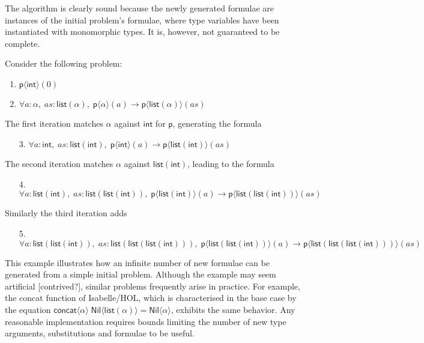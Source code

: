 \documentclass[]{ceurart}
\newcommand\ty[1]{\textsf{#1}}
\newcommand\sym[1]{\textsf{#1}}
\begin{document}
The algorithm is clearly sound because the newly generated formulae are instances of the initial problem's formulae, where type variables have been instantiated with monomorphic types. It is, however, not guaranteed to be complete.

\begin{example}Consider the following problem:
\begin{enumerate}
   \item \(\sym{p}\langle \ty{int}\rangle(0)\)
   \item \(\forall a: \alpha{,}\; \mathit{as}:\ty{list}(\alpha){,}\; \sym{p}\langle\alpha\rangle(a) \rightarrow \sym{p}\langle \ty{list}(\alpha)\rangle(\mathit{as})\)
\end{enumerate}
%
The first iteration matches \(\alpha\) against \(\ty{int}\) for $\sym{p}$, generating the formula
%
\begin{enumerate}
   \item[3.] \(\forall a: \ty{int}{,}\; \mathit{as}:\ty{list}(\ty{int}){,}\; \sym{p}\langle\ty{int}\rangle(a) \rightarrow \sym{p}\langle \ty{list}(\ty{int})\rangle(\mathit{as})\)
\end{enumerate}
%
The second iteration matches \(\alpha\) against \(\ty{list}(\ty{int})\), leading to the formula
%
\begin{enumerate}
   \item[4.] \(\forall a: \ty{list}(\ty{int}){,}\; \mathit{as}:\ty{list}(\ty{list}(\ty{int})){,}\; \sym{p}\langle\ty{list}(\ty{int})\rangle(a) \rightarrow \sym{p}\langle \ty{list}(\ty{list}(\ty{int}))\rangle(\mathit{as})\)
\end{enumerate}
%
Similarly the third iteration adds
%
\begin{enumerate}
   \item[5.] \(\forall a: \ty{list}(\ty{list}(\ty{int})){,}\; \mathit{as}:\ty{list}(\ty{list}(\ty{list}(\ty{int}))){,}\; \sym{p}\langle\ty{list}(\ty{list}(\ty{int}))\rangle(a) \rightarrow \sym{p}\langle \ty{list}(\ty{list}(\ty{list}(\ty{int})))\rangle(\mathit{as})\)
\end{enumerate}

\end{example}

This example illustrates how an infinite number of new formulae can be generated from a simple initial problem. Although the example may seem artificial [contrived?], similar problems frequently arise in practice. For example, the \sym{concat} function of Isabelle/HOL, which is characterised in the base case by the equation \(\sym{concat}\langle\alpha\rangle\; \sym{Nil}\langle\ty{list}(\alpha)\rangle = \sym{Nil}\langle\alpha\rangle\), exhibits the same behavior. Any reasonable implementation requires bounds limiting the number of new type arguments, substitutions and formulae to be useful.
\end{document}
